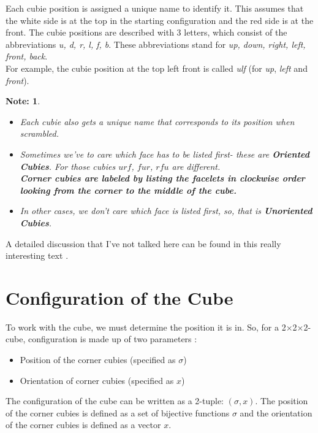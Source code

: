 \documentclass[12pt,a4paper]{article}
\theoremstyle{custom}
\newtheorem*{note}{Note:}
\newcommand{\Ttwo}{2$\times$2$\times$2-}
\begin{document}
Each cubie position is assigned a unique name to identify it. This assumes that the white side is at the top in the starting configuration and the red side is at the front. The cubie positions are described with 3 letters, which consist of the abbreviations \textit{u, d, r, l, f, b}. These abbreviations stand for \textit{up, down, right, left, front, back}. \\
For example, the cubie position at the top left front is called \textit{ulf} (for \textit{up}, \textit{left} and \textit{front}).
\begin{note}
    \begin{itemize}
        \item Each cubie also gets a unique name that corresponds to its position when scrambled. 
        \item Sometimes we've to care which face has to be listed first- these are \textbf{Oriented Cubies}. For those cubies $urf$, $fur$, $rfu$ are different.\\
\textbf{Corner cubies are labeled by listing the facelets in clockwise order looking from the corner to the middle of the cube.}
        
\item In other cases, we don't care which face is listed first, so, that is \textbf{Unoriented Cubies}. 

\end{itemize}
\end{note}
A detailed discussion that I've not talked here can be found in this really interesting text \cite{lutterworth}. 


\section{Configuration of the Cube}
\label{Chapter_ConfigurationOfCube}

To work with the cube, we must determine the position it is in.
So, for a \Ttwo  cube, configuration is made up of two parameters :
\begin{itemize}
\item Position of the corner cubies (specified as $\sigma$)
\item Orientation of corner cubies (specified as $x$)
\end{itemize}
The configuration of the cube can be written as a 2-tuple: $(\sigma, x)$.
The position of the corner cubies is defined as a set of bijective functions $\sigma$ and the orientation of the corner cubies is defined as a vector $x$.
\end{document}
